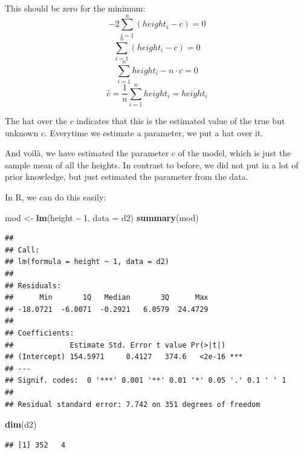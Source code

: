 \documentclass[
]{book}
\newenvironment{Shaded}{\begin{snugshade}}{\end{snugshade}}
\newcommand{\AttributeTok}[1]{\textcolor[rgb]{0.13,0.29,0.53}{#1}}
\newcommand{\CommentTok}[1]{\textcolor[rgb]{0.56,0.35,0.01}{\textit{#1}}}
\newcommand{\DecValTok}[1]{\textcolor[rgb]{0.00,0.00,0.81}{#1}}
\newcommand{\FunctionTok}[1]{\textcolor[rgb]{0.13,0.29,0.53}{\textbf{#1}}}
\newcommand{\NormalTok}[1]{#1}
\newcommand{\OtherTok}[1]{\textcolor[rgb]{0.56,0.35,0.01}{#1}}
\newcommand{\SpecialCharTok}[1]{\textcolor[rgb]{0.81,0.36,0.00}{\textbf{#1}}}
\begin{document}
This should be zero for the minimum:
\[ -2 \sum_{i=1}^{n} (height_i - c) = 0\]
\[ \sum_{i=1}^{n} (height_i - c) = 0\]
\[ \sum_{i=1}^{n} height_i - n \cdot c = 0\]
\[ \hat{c} = \frac{1}{n} \sum_{i=1}^{n} height_i = \overline{height_i}\]

The hat over the \(c\) indicates that this is the estimated value of the
true but unknown \(c\).
Everytime we estimate a parameter, we put a hat over it.

And voilà, we have estimated the parameter \(c\) of the model, which is just the
sample mean of all the heights. In contrast to before, we did not put
in a lot of prior knowledge, but just estimated the parameter from the data.

In R, we can do this easily:

\begin{Shaded}
\begin{Highlighting}[]
\NormalTok{mod }\OtherTok{\textless{}{-}} \FunctionTok{lm}\NormalTok{(height }\SpecialCharTok{\textasciitilde{}} \DecValTok{1}\NormalTok{, }\AttributeTok{data =}\NormalTok{ d2)}
\FunctionTok{summary}\NormalTok{(mod)}
\end{Highlighting}
\end{Shaded}

\begin{verbatim}
## 
## Call:
## lm(formula = height ~ 1, data = d2)
## 
## Residuals:
##      Min       1Q   Median       3Q      Max 
## -18.0721  -6.0071  -0.2921   6.0579  24.4729 
## 
## Coefficients:
##             Estimate Std. Error t value Pr(>|t|)    
## (Intercept) 154.5971     0.4127   374.6   <2e-16 ***
## ---
## Signif. codes:  0 '***' 0.001 '**' 0.01 '*' 0.05 '.' 0.1 ' ' 1
## 
## Residual standard error: 7.742 on 351 degrees of freedom
\end{verbatim}

\begin{Shaded}
\begin{Highlighting}[]
\FunctionTok{dim}\NormalTok{(d2)}
\end{Highlighting}
\end{Shaded}

\begin{verbatim}
## [1] 352   4
\end{verbatim}

\begin{Shaded}
\end{Shaded}
\end{document}
